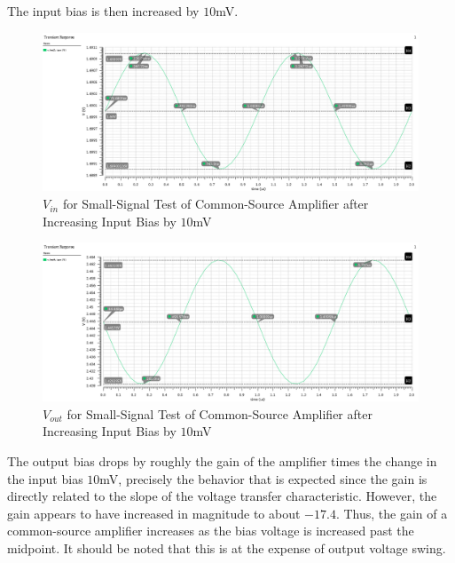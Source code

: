 
The input bias is then increased by $10$\si{\milli\volt}.

\FloatBarrier

\begin{figure}[h!]
	\centering
	\includegraphics[scale=0.45]{./images/sim2_vin_plus10mV.PNG}
	\caption{$V_{in}$ for Small-Signal Test of Common-Source Amplifier after Increasing Input Bias by $10$\si{\milli\volt}}
	\label{fig:sim2_vin_plus10mV}
\end{figure}

\FloatBarrier

\FloatBarrier

\begin{figure}[h!]
	\centering
	\includegraphics[scale=0.45]{./images/sim2_vout_plus10mV.PNG}
	\caption{$V_{out}$ for Small-Signal Test of Common-Source Amplifier after Increasing Input Bias by $10$\si{\milli\volt}}
	\label{fig:sim2_vout_plus10mV}
\end{figure}

\FloatBarrier

The output bias drops by roughly the gain of the amplifier times the change in the input bias $10$\si{\milli\volt}, precisely the behavior that is expected since the gain is directly related to the slope of the voltage transfer characteristic.
However, the gain appears to have increased in magnitude to about $-17.4$.
Thus, the gain of a common-source amplifier increases as the bias voltage is increased past the midpoint.
It should be noted that this is at the expense of output voltage swing.
